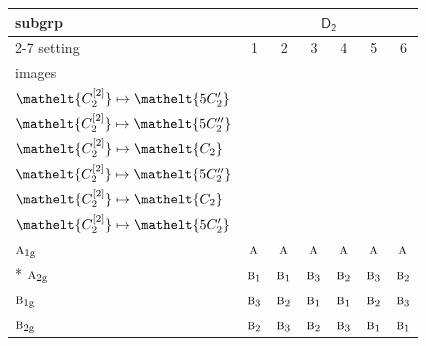 \documentclass[10pt,a4paper]{article}
\numberwithin{equation}{section}
\newcommand{\eltfont}[1]{{\let\sigma\eltsigma\mathelt{#1}}}
\newcommand{\grp}[1]{\mathsf{#1}}
\newcommand{\irr}[1]{\text{\normalfont\scshape #1}}
\newcommand{\cls}[1]{\eltfont{#1}}
\newcommand{\ptag}[1]{\mathrm{#1}}
\newcommand{\genidx}[2]{#1^{[\mathrm{#2}]}}
\begin{document}
{\small\begin{longtable}{@{}lcccccc@{}}\toprule
subgrp & \multicolumn{6}{c}{\href{D2.pdf}{$\grp{D_{2}}$}}\\\cmidrule(lr){2-7}
setting & 1 & 2 & 3 & 4 & 5 & 6\\
images & {\scriptsize\begin{tabular}[t]{@{}c@{}}$\cls{\genidx{C_{2}}{1}} \mapsto \cls{C_{2}}$\\$\cls{\genidx{C_{2}}{2}} \mapsto \cls{5C_{2}'}$\end{tabular}} & {\scriptsize\begin{tabular}[t]{@{}c@{}}$\cls{\genidx{C_{2}}{1}} \mapsto \cls{C_{2}}$\\$\cls{\genidx{C_{2}}{2}} \mapsto \cls{5C_{2}''}$\end{tabular}} & {\scriptsize\begin{tabular}[t]{@{}c@{}}$\cls{\genidx{C_{2}}{1}} \mapsto \cls{5C_{2}'}$\\$\cls{\genidx{C_{2}}{2}} \mapsto \cls{C_{2}}$\end{tabular}} & {\scriptsize\begin{tabular}[t]{@{}c@{}}$\cls{\genidx{C_{2}}{1}} \mapsto \cls{5C_{2}'}$\\$\cls{\genidx{C_{2}}{2}} \mapsto \cls{5C_{2}''}$\end{tabular}} & {\scriptsize\begin{tabular}[t]{@{}c@{}}$\cls{\genidx{C_{2}}{1}} \mapsto \cls{5C_{2}''}$\\$\cls{\genidx{C_{2}}{2}} \mapsto \cls{C_{2}}$\end{tabular}} & {\scriptsize\begin{tabular}[t]{@{}c@{}}$\cls{\genidx{C_{2}}{1}} \mapsto \cls{5C_{2}''}$\\$\cls{\genidx{C_{2}}{2}} \mapsto \cls{5C_{2}'}$\end{tabular}}\\\midrule\endhead
\bottomrule\endfoot\endlastfoot
$\irr{a}_{1\ptag{g}}$ & $\irr{a}$ & $\irr{a}$ & $\irr{a}$ & $\irr{a}$ & $\irr{a}$ & $\irr{a}$\\*
$\irr{a}_{2\ptag{g}}$ & $\irr{b}_{1}$ & $\irr{b}_{1}$ & $\irr{b}_{3}$ & $\irr{b}_{2}$ & $\irr{b}_{3}$ & $\irr{b}_{2}$\\
$\irr{b}_{1\ptag{g}}$ & $\irr{b}_{3}$ & $\irr{b}_{2}$ & $\irr{b}_{1}$ & $\irr{b}_{1}$ & $\irr{b}_{2}$ & $\irr{b}_{3}$\\
$\irr{b}_{2\ptag{g}}$ & $\irr{b}_{2}$ & $\irr{b}_{3}$ & $\irr{b}_{2}$ & $\irr{b}_{3}$ & $\irr{b}_{1}$ & $\irr{b}_{1}$\\

\end{longtable}}
\end{document}
